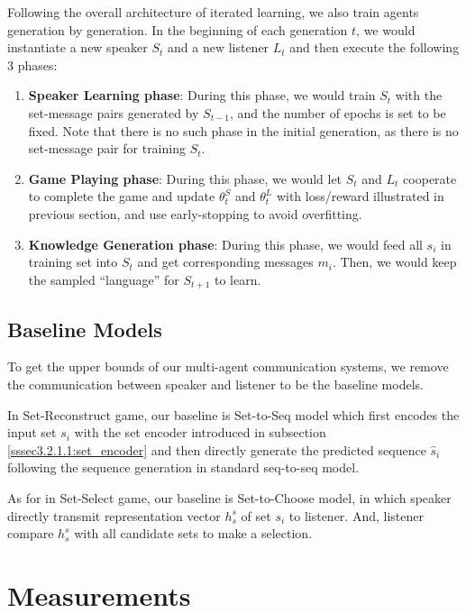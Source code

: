 Following the overall architecture of iterated learning, we also train agents generation by generation. In the beginning of each generation $t$, we would instantiate a new speaker $S_t$ and a new listener $L_t$ and then execute the following 3 phases:

\begin{enumerate}
  \item \textbf{Speaker Learning phase}: During this phase, we would train $S_t$ with the set-message pairs generated by $S_{t-1}$, and the number of epochs is set to be fixed. Note that there is no such phase in the initial generation, as there is no set-message pair for training $S_t$.
  \item \textbf{Game Playing phase}: During this phase, we would let $S_t$ and $L_t$ cooperate to complete the game and update $\theta^S_t$ and $\theta^L_t$ with loss/reward illustrated in previous section, and use early-stopping to avoid overfitting.
  \item \textbf{Knowledge Generation phase}: During this phase, we would feed all $s_i$ in training set into $S_t$ and get corresponding messages $m_i$. Then, we would keep the sampled ``language'' for $S_{t+1}$ to learn.
\end{enumerate}

\subsection{Baseline Models}
\label{ssec3.2.5:baselines}

To get the upper bounds of our multi-agent communication systems, we remove the communication between speaker and listener to be the baseline models.

In Set-Reconstruct game, our baseline is Set-to-Seq model which first encodes the input set $s_i$ with the set encoder introduced in subsection \ref{sssec3.2.1.1:set_encoder} and then directly generate the predicted sequence $\hat{s}_i$ following the sequence generation in standard seq-to-seq model.

As for in Set-Select game, our baseline is Set-to-Choose model, in which speaker directly transmit representation vector $h^s_s$ of set $s_i$ to listener. And, listener compare $h^s_s$ with all candidate sets to make a selection.

\section{Measurements}
\label{sec3.3:measurements}

